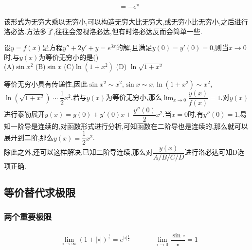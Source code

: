 \documentclass[8pt a4paper, oneside, UTF8]{ctexbook}
\begin{document}
\begin{sloppypar}
\begin{solution}
\begin{align*}
                      & = -e^\pi
        \end{align*}
    \end{solution}
    \begin{note}
        该形式为无穷大乘以无穷小,可以构造无穷大比无穷大,或无穷小比无穷小,之后进行洛必达.方法多了,往往会忽视洛必达,但有时洛必达反而会简单一些.
    \end{note}
    \begin{problem}
    设$y=f(x)$是方程$y''+2y'+y=e^{3x}$的解,且满足$y(0)=y'(0)=0$,则当$x\to 0$时,与$y(x)$为等价无穷小的是()\\
    (A)$\sin x^2$ \qquad (B)$\sin x$ \qquad (C)$\ln(1+x^2)$ \qquad (D) $\ln \sqrt{1+x^2}$
    \end{problem}
    \begin{solution}
        等价无穷小具有传递性,因此$\sin x^2 \sim x^2$,$\sin x \sim x$,$\ln (1+x^2) \sim x^2$,$\ln (\sqrt{1+x^2})\sim \dfrac{1}{2}x^2$.若与$y(x)$为等价无穷小,那么$\lim_{x\to 0}\dfrac{y(x)}{f(x)}=1$.对$y(x)$进行泰勒展开$y(x)=y(0)+y'(0)x+\dfrac{y''(0)}{2}x^2.$当$x=0$时,有$y''(0)=1$,易知一阶导是连续的,对函数形式进行分析,可知函数在二阶导也是连续的,那么就可以展开到二阶,那么$y(x)=\dfrac{1}{2}x^2$.\\
        除此之外,还可以这样解决,已知二阶导连续,那么对$\dfrac{y(x)}{A/B/C/D}$进行洛必达可知D选项正确.
    \end{solution}
    \subsection{等价替代求极限}
    \subsubsection{两个重要极限}
    \begin{align*} \boxed
        {
            \begin{aligned}
                 & \lim_{\square \to \infty }(1+|\square|)^{\frac{1}{\square}}=e^{|\square| \frac{1}{\square}} \qquad &  & \lim _ { \square \rightarrow 0 } \dfrac { \sin \square } { \square } = 1 \\
            \end{aligned}
        }
    \end{align*}

\end{sloppypar}
\end{document}

